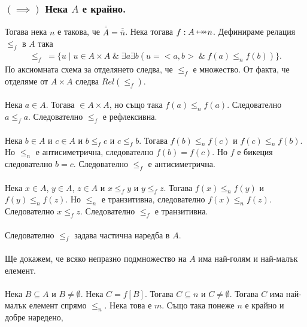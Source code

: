 \documentclass[12pt]{article}
\newcommand{\bijection}[0]{\mathbin{\mathlarger{\mathlarger{\rightarrowtail}} \hspace{-14pt} \mathlarger{\mathlarger{\twoheadrightarrow}}}}
\begin{document}
\subsubsection*{\((\implies)\) Нека \(A\) е крайно.}
Тогава нека \(n\) е такова, че \(\overline{\overline{A}} = \overline{\overline{n}}\).
Нека тогава \(f : A \bijection n\). Дефинираме релация \(\leq_f\) в \(A\)
така
\begin{align*}
    \leq_f \; = \{u \; | \; u \in A \times A \; \& \; \exists a \exists b (u = <a, b> \; \& \; f(a) \leq_n f(b)) \}.
\end{align*}
По аксиомната схема за отделянето следва, че \(\leq_f\) е множество.
От факта, че отделяме от \(A \times A\) следва \(Rel(\leq_f)\).
\\
\vspace{1mm}
\\
Нека \(a \in A\). Тогава \(<a, a> \in A \times A\), но също така \(f(a) \leq_n f(a)\).
Следователно \(a \leq_f a\). Следователно \(\leq_f\) е рефлексивна.
\\
\vspace{1mm}
\\
Нека \(b \in A\) и \(c \in A\) и \(b \leq_f c\) и \(c \leq_f b\).
Тогава \(f(b) \leq_n f(c)\) и \(f(c) \leq_n f(b)\).
Но \(\leq_n\) е антисиметрична, следователно \(f(b) = f(c)\).
Но \(f\) е бикеция следователно \(b = c\).
Следователно \(\leq_f\) е антисиметрична.
\\
\vspace{1mm}
\\
Нека \(x \in A\), \(y \in A\), \(z \in A\)
и \(x \leq_f y\) и \(y \leq_f z\).
Тогава \(f(x) \leq_n f(y)\) и \(f(y) \leq_n f(z)\).
Но \(\leq_n\) е транзитивна, следователно \(f(x) \leq_n f(z)\).
Следователно \(x \leq_f z\).
Следователно \(\leq_f\) е транзитивна.
\\
\vspace{1mm}
\\
Следователно \(\leq_f\) задава частична наредба в \(A\).
\\
\vspace{1mm}
\\
Ще докажем, че всяко непразно подмножество на \(A\) има най-голям и най-малък елемент.
\\
\vspace{1mm}
\\
Нека \(B \subseteq A\) и \(B \neq \emptyset\).
Нека \(C = f[B]\). Тогава \(C \subseteq n\) и \(C \neq \emptyset\).
Тогава \(C\) има най-малък елемент спрямо \(\leq_n\). Нека това е \(m\).
Също така понеже \(n\) е крайно и добре наредено,
\end{document}
